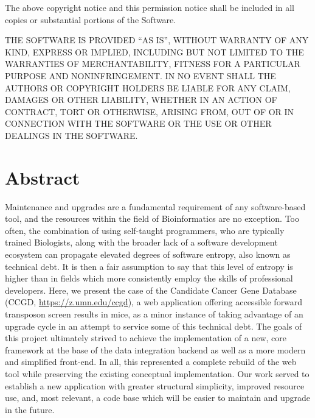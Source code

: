 \documentclass[10pt]{report}
\begin{document}
The above copyright notice and this permission notice shall be included in all copies or substantial portions of the Software.

THE SOFTWARE IS PROVIDED ``AS IS'', WITHOUT WARRANTY OF ANY KIND, EXPRESS OR IMPLIED, INCLUDING BUT NOT LIMITED TO THE WARRANTIES OF MERCHANTABILITY, FITNESS FOR A PARTICULAR PURPOSE AND NONINFRINGEMENT\@. IN NO EVENT SHALL THE AUTHORS OR COPYRIGHT HOLDERS BE LIABLE FOR ANY CLAIM, DAMAGES OR OTHER LIABILITY, WHETHER IN AN ACTION OF CONTRACT, TORT OR OTHERWISE, ARISING FROM, OUT OF OR IN CONNECTION WITH THE SOFTWARE OR THE USE OR OTHER DEALINGS IN THE SOFTWARE\@.

%
%
%

\newpage

\section{Abstract}
Maintenance and upgrades are a fundamental requirement of any software-based tool, and the resources within the field of Bioinformatics are no exception. Too often, the combination of using self-taught programmers, who are typically trained Biologists, along with the broader lack of a software development ecosystem can propagate elevated degrees of software entropy, also known as technical debt. It is then a fair assumption to say that this level of entropy is higher than in fields which more consistently employ the skills of professional developers. Here, we present the case of the Candidate Cancer Gene Database (CCGD, \url{https://z.umn.edu/ccgd}), a web application offering accessible forward transposon screen results in mice, as a minor instance of taking advantage of an upgrade cycle in an attempt to service some of this technical debt. The goals of this project ultimately strived to achieve the implementation of a new, core framework at the base of the data integration backend as well as a more modern and simplified front-end. In all, this represented a complete rebuild of the web tool while preserving the existing conceptual implementation. Our work served to establish a new application with greater structural simplicity, improved resource use, and, most relevant, a code base which will be easier to maintain and upgrade in the future.

\tableofcontents
{}
\listoftables
{}
\listoffigures
\end{document}
